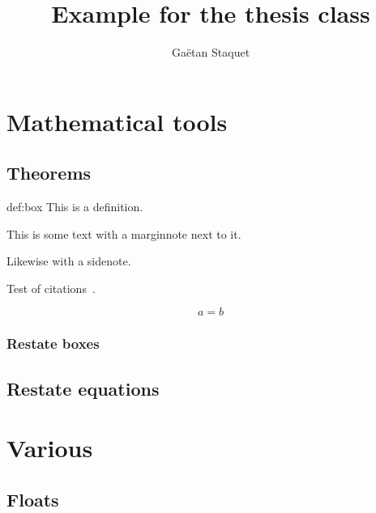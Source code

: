 \documentclass[
  a4paper,
  fontsize = 11pt,
  english,
  openany,
  twoside = false,
  roman equations,
]{thesis}
\title{Example for the thesis class}
\author{Gaëtan Staquet}
\begin{document}
  \frontmatter
  \maketitle

  \tableofcontents

  \mainmatter

  \chapter{Mathematical tools}

  \chapterTOC

  \section{Theorems}

  \begin{definition*}{def:box}
    This is a definition.
  \end{definition*}

  This is some text with a marginnote next to it.

  Likewise with a sidenote.

  Test of citations~.

  \begin{equation}
    a = b\label{eq:a:b}
  \end{equation}
  \marginnote{\aEqualb}

  \subsection{Restate boxes}


  \section{Restate equations}

  \chapter{Various}

  \section{Floats}
\end{document}
